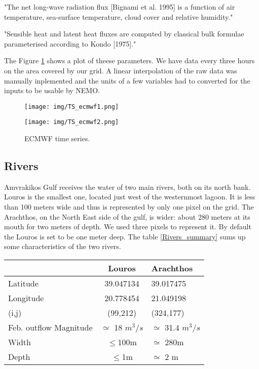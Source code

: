 \documentclass[english]{PFeENSTA}
\begin{document}
{"The net long-wave radiation flux [Bignami et al. 1995] is a function of air temperature, sea-surface temperature, cloud cover and relative humidity."

"Sensible heat and latent heat fluxes are computed by classical bulk formulae  parameterised  according  to  Kondo  [1975]."

The Figure \ref{fig:ECMWF_Forcing} shows a plot of theese parameters. We have data every three hours on the area covered by our grid. A linear interpolation of the raw data was manually inplemented and the units of a few variables had to converted for the inputs to be usable by NEMO. 


\begin{figure}[H]
   \begin{minipage}[h!]{1\linewidth}
	\centering
	\texttt{[image: img/TS\_ecmwf1.png]}
   \end{minipage}
   \begin{minipage}[h!]{1\linewidth}
	\centering
	\texttt{[image: img/TS\_ecmwf2.png]}
   \end{minipage} 
  
\caption{\label{fig:ECMWF_Forcing}ECMWF time series.}
\end{figure}

\subsection{Rivers}
Amvrakikos Gulf receives the water of two main rivers, both on its north bank. Louros is the smallest one, located just west of the westernmost lagoon. It is less than 100 meters wide and thus is  represented by only one pixel on the grid. The Arachthos, on the North East side of the gulf, is wider: about 280 meters at its mouth for two meters of depth. We used three pixels to represent it. By default the Louros is set to be one meter deep.
The table \ref{Rivers_summary} sums up some characteristics of the two rivers.

\begin{table}[!h]
\begin{center}
  \begin{tabular}{| l | c | l| }
    \hline
      & Louros & Arachthos \\ \hline
    Latitude & 39.047134 & 39.017475\\ \hline
    Longitude  & 20.778454 & 21.049198\\ \hline
    (i,j) & (99,212) & (324,177)\\ \hline
    Feb. outflow Magnitude  & $\simeq$ 18 $m^3 /s$ & $\simeq$ 31.4 $m^3 /s$\\ \hline
	Width  & $\leq$100m &	$\simeq$ 280m\\ \hline
	Depth  & $\leq$1m & $\simeq$ 2 m\\
            

\end{tabular}
\end{center}
\end{table}}
\end{document}
